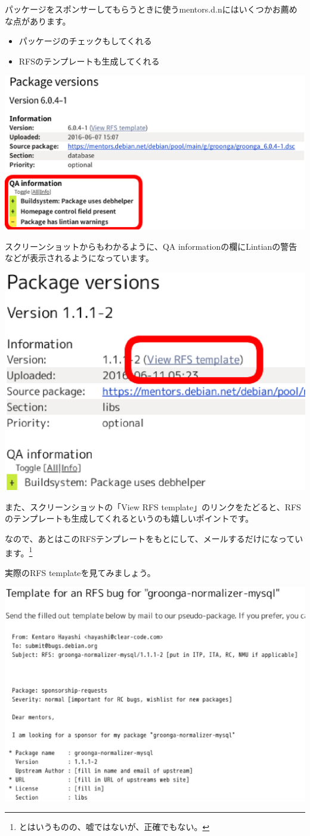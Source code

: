 \documentclass[mingoth,a4paper]{jsarticle}
\begin{document}
パッケージをスポンサーしてもらうときに使うmentors.d.nにはいくつかお薦めな点があります。

\begin{itemize}
  \item パッケージのチェックもしてくれる
  \item RFSのテンプレートも生成してくれる
\end{itemize}

\begin{screen}
  \includegraphics[width=0.8\hsize]{image201606/qa-information.eps}
\end{screen}

スクリーンショットからもわかるように、QA informationの欄にLintianの警告などが表示されるようになっています。

\begin{screen}
  \includegraphics[width=0.5\hsize]{image201606/view-rfs-template.eps}
\end{screen}

また、スクリーンショットの「View RFS template」のリンクをたどると、RFSのテンプレートも生成してくれるというのも嬉しいポイントです。

なので、あとはこのRFSテンプレートをもとにして、メールするだけになっています。\footnote{とはいうものの、嘘ではないが、正確でもない。}

実際のRFS templateを見てみましょう。

\begin{screen}
\includegraphics[width=0.5\hsize]{image201606/rfs-template-pithole.eps}
\end{screen}
\end{document}
